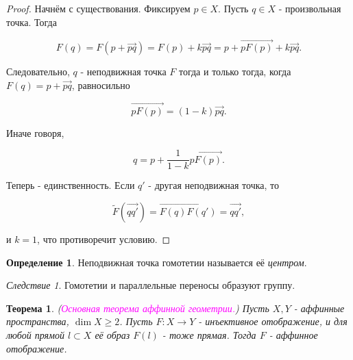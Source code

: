 \documentclass[a4paper,100pt]{article}
\theoremstyle{indented}
\newtheorem{theorem}{Теорема}
\theoremstyle{definition}
\newtheorem{defn}{Определение}
\theoremstyle{remark}
\newtheorem{cons}{Следствие}
\DeclareMathOperator{\ra}{\rightarrow}
\begin{document}
\begin{proof}
    Начнём с существования. Фиксируем $p \in X$. Пусть $q \in X$ - произвольная точка. Тогда 

    \[
        F(q) = F(p+ \overrightarrow{pq}) = F(p) + k \overrightarrow{pq} = p + \overrightarrow{pF(p)} + k \overrightarrow{pq}.
    \]

    Следовательно, $q$ - неподвижная точка $F$ тогда и только тогда, когда $F(q) = p+ \overrightarrow{pq}$, равносильно

    \[
        \overrightarrow{pF(p)} = (1-k) \overrightarrow{pq}.
    \]

    Иначе говоря, 

    \[
        q = p + \frac{1}{1-k} \overrightarrow{p F(p)}.
    \]

    Теперь - единственность. Если $q'$ - другая неподвижная точка, то 

    \[
        \tilde{F}(\overrightarrow{qq'}) = \overrightarrow{F(q)F(q')} = \overrightarrow{qq'}, 
    \]

    и $k = 1$, что противоречит условию.
\end{proof}

\begin{defn}
    Неподвижная точка гомотетии называется её \textit{центром}.
\end{defn}

\begin{cons}
    Гомотетии и параллельные переносы образуют группу.
\end{cons}

\begin{theorem}
    (\textit{\textcolor{magenta}{\hypertarget{s31}{Основная теорема аффинной геометрии.}}}) Пусть $X, Y$ - аффинные пространства, $\dim X \geq 2$. Пусть $F: X\ra Y$ - инъективное отображение, и для любой прямой $l\subset X$ её образ $F(l)$ - тоже прямая. Тогда $F$ - аффинное отображение.
\end{theorem}
\end{document}
